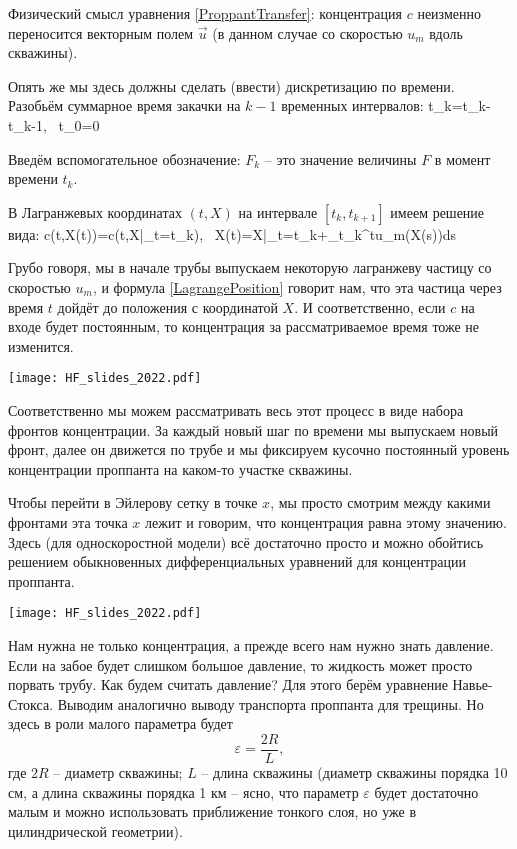 \documentclass[main.tex]{subfiles}
\begin{document}
Физический смысл уравнения \eqref{ProppantTransfer}: концентрация $c$ неизменно переносится векторным полем $\vec{u}$ (в данном случае со скоростью $u_m$ вдоль скважины).

Опять же мы здесь должны сделать (ввести) дискретизацию по времени.
Разобьём суммарное время закачки на $k-1$ временных интервалов:
\beq
\Delta t_k=t_k-t_{k-1},\,\,\,\,\,t_0=0
\eeq

Введём вспомогательное обозначение: $F_k$ -- это значение величины $F$ в момент времени $t_k$.

В Лагранжевых координатах $(t,X)$ на интервале $[t_k, t_{k+1}]$ имеем решение вида:
\beq\label{LagrangePosition}
c(t,X(t))=c(t,X|_{t=t_k}),\,\,\,\,\,X(t)=X|_{t=t_k}+\int\limits_{t_k}^{t}u_m(X(s))ds
\eeq

Грубо говоря, мы в начале трубы выпускаем некоторую лагранжеву частицу со скоростью $u_m$, и формула \eqref{LagrangePosition} говорит нам, что эта частица через время $t$ дойдёт до положения с координатой $X$.
И соответственно, если $c$ на входе будет постоянным, то концентрация за рассматриваемое время тоже не изменится.

\texttt{[image: HF\_slides\_2022.pdf]}

Соответственно мы можем рассматривать весь этот процесс в виде набора фронтов концентрации.
За каждый новый шаг по времени мы выпускаем новый фронт, далее он движется по трубе и мы фиксируем кусочно постоянный уровень концентрации проппанта на каком-то участке скважины.

Чтобы перейти в Эйлерову сетку в точке $x$, мы просто смотрим между какими фронтами эта точка $x$ лежит и говорим, что концентрация равна этому значению.
\\
Здесь (для односкоростной модели) всё достаточно просто и можно обойтись решением обыкновенных дифференциальных уравнений для концентрации проппанта.

\texttt{[image: HF\_slides\_2022.pdf]}

Нам нужна не только концентрация, а прежде всего нам нужно знать давление.
Если на забое будет слишком большое давление, то жидкость может просто порвать трубу.
Как будем считать давление?
Для этого берём уравнение Навье-Стокса.
Выводим аналогично выводу транспорта проппанта для трещины.
Но здесь в роли малого параметра будет
$$\varepsilon=\frac{2R}{L},$$
где $2R$ -- диаметр скважины; $L$ -- длина скважины (диаметр скважины порядка 10 см, а длина скважины порядка 1 км -- ясно, что параметр $\varepsilon$ будет достаточно малым и можно использовать приближение тонкого слоя, но уже в цилиндрической геометрии).
\end{document}
